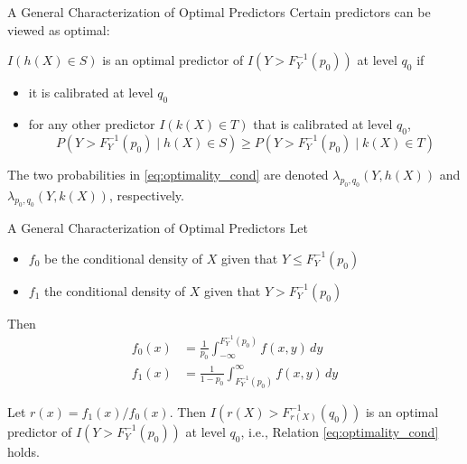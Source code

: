 \documentclass{beamer}
\begin{document}
\begin{frame}{A General Characterization of Optimal Predictors}
    Certain predictors can be viewed as optimal: 
    \begin{definition}\label{d:opt-pred}
        $I(h(X) \in S)$ is an optimal predictor of $I(Y > F_Y^{-1}(p_0))$ at level $q_0$ if
        \begin{itemize}
            \item it is calibrated at level $q_0$
            \item for any other predictor $I(k(X) \in T)$ that is calibrated at level $q_0$,
            \begin{equation}\label{eq:optimality_cond}
            P(Y > F_Y^{-1}(p_0) \mid h(X) \in S) \ge P(Y > F_Y^{-1}(p_0) \mid k(X) \in T)
            \end{equation}
        \end{itemize}
        The two probabilities in \eqref{eq:optimality_cond} are denoted $\lambda_{p_0, q_0}(Y, h(X))$ and $\lambda_{p_0, q_0}(Y, k(X))$, respectively.
    \end{definition}
\end{frame}

\begin{frame}{A General Characterization of Optimal Predictors}
    Let
    \begin{itemize}
        \item $f_0$ be the conditional density of $X$ given that $Y \le F_Y^{-1}(p_0)$
        \item $f_1$ the conditional density of $X$ given that $Y > F_Y^{-1}(p_0)$
    \end{itemize}
    Then
    \begin{align*}
        f_0(x) &= \frac{1}{p_0}\int_{-\infty}^{F_Y^{-1}(p_0)} f(x, y)\,dy \\
        f_1(x) &= \frac{1}{1 - p_0}\int_{F_Y^{-1}(p_0)}^{\infty} f(x, y)\,dy
    \end{align*}

    \begin{theorem}\label{thm:base_thm}
        Let $r(x) = f_1(x) / f_0(x)$. Then $I(r(X) > F_{r(X)}^{-1}(q_0))$ is an optimal predictor of $I(Y > F_Y^{-1}(p_0))$ at level $q_0$, i.e., Relation \eqref{eq:optimality_cond} holds.
    \end{theorem}
\end{frame}
\end{document}
